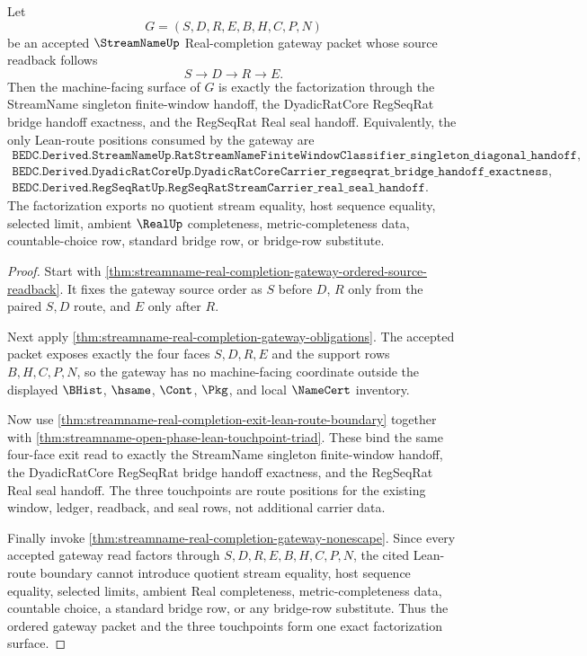 \begin{theorem}
\label{thm:streamname-real-completion-gateway-touchpoint-factorization}
Let
$$
G=(S,D,R,E,B,H,C,P,N)
$$
be an accepted $\StreamNameUp$ Real-completion gateway packet whose source readback follows
$$
S \longrightarrow D \longrightarrow R \longrightarrow E .
$$
Then the machine-facing surface of $G$ is exactly the factorization through the StreamName singleton finite-window handoff, the DyadicRatCore RegSeqRat bridge handoff exactness, and the RegSeqRat Real seal handoff. Equivalently, the only Lean-route positions consumed by the gateway are
$$
\begin{gathered}
\texttt{BEDC.Derived.StreamNameUp.RatStreamNameFiniteWindowClassifier\_singleton\_diagonal\_handoff},\\
\texttt{BEDC.Derived.DyadicRatCoreUp.DyadicRatCoreCarrier\_regseqrat\_bridge\_handoff\_exactness},\\
\texttt{BEDC.Derived.RegSeqRatUp.RegSeqRatStreamCarrier\_real\_seal\_handoff}.
\end{gathered}
$$
The factorization exports no quotient stream equality, host sequence equality, selected limit, ambient $\RealUp$ completeness, metric-completeness data, countable-choice row, standard bridge row, or bridge-row substitute.
\end{theorem}
\begin{proof}
Start with \autoref{thm:streamname-real-completion-gateway-ordered-source-readback}. It fixes the gateway source order as $S$ before $D$, $R$ only from the paired $S,D$ route, and $E$ only after $R$.

Next apply \autoref{thm:streamname-real-completion-gateway-obligations}. The accepted packet exposes exactly the four faces $S,D,R,E$ and the support rows $B,H,C,P,N$, so the gateway has no machine-facing coordinate outside the displayed $\BHist$, $\hsame$, $\Cont$, $\Pkg$, and local $\NameCert$ inventory.

Now use \autoref{thm:streamname-real-completion-exit-lean-route-boundary} together with \autoref{thm:streamname-open-phase-lean-touchpoint-triad}. These bind the same four-face exit read to exactly the StreamName singleton finite-window handoff, the DyadicRatCore RegSeqRat bridge handoff exactness, and the RegSeqRat Real seal handoff. The three touchpoints are route positions for the existing window, ledger, readback, and seal rows, not additional carrier data.

Finally invoke \autoref{thm:streamname-real-completion-gateway-nonescape}. Since every accepted gateway read factors through $S,D,R,E,B,H,C,P,N$, the cited Lean-route boundary cannot introduce quotient stream equality, host sequence equality, selected limits, ambient Real completeness, metric-completeness data, countable choice, a standard bridge row, or any bridge-row substitute. Thus the ordered gateway packet and the three touchpoints form one exact factorization surface.
\end{proof}


